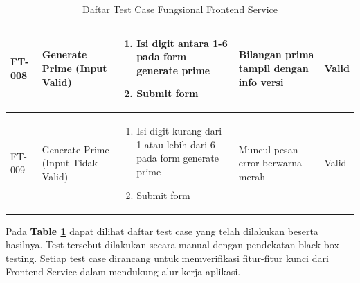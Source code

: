 \begin{table}[H]
\begin{adjustbox}{width=\textwidth}
\begin{tabular}{|p{0.8cm}|p{2.6cm}|p{4.5cm}|p{3.8cm}|p{1.2cm}|}
      FT-008                                                                      & Generate Prime (Input Valid)       &
      \begin{enumerate}[leftmargin=*,noitemsep,topsep=0pt,label=\arabic*.,widest=99]
        \item Isi digit antara 1-6 pada form generate prime
        \item Submit form
      \end{enumerate}            &
      Bilangan prima tampil dengan info versi                                     & Valid                                                                                                      \\ \hline

      FT-009                                                                      & Generate Prime (Input Tidak Valid) &
      \begin{enumerate}[leftmargin=*,noitemsep,topsep=0pt,label=\arabic*.,widest=99]
        \item Isi digit kurang dari 1 atau lebih dari 6 pada form generate prime
        \item Submit form
      \end{enumerate}    &
      Muncul pesan error berwarna merah                                           & Valid                                                                                                      \\ \hline

    \end{tabular}
  \end{adjustbox}
  \caption{Daftar Test Case Fungsional Frontend Service}
  \label{tab:test-case-frontend}
\end{table}

Pada \textbf{Table \ref{tab:test-case-frontend}} dapat dilihat daftar test case
yang telah dilakukan beserta hasilnya. Test tersebut dilakukan secara manual
dengan pendekatan black-box testing. Setiap test case dirancang untuk
memverifikasi fitur-fitur kunci dari Frontend Service dalam mendukung alur
kerja aplikasi.

